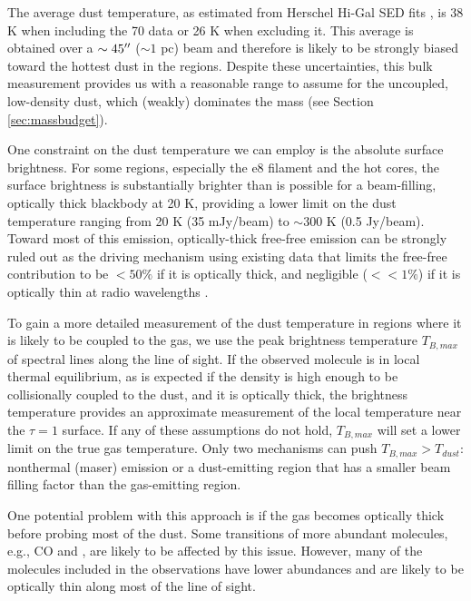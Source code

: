 \documentclass{aa}
\begin{document}
The average dust temperature, as estimated from Herschel Hi-Gal SED fits
\citep{Molinari2016a,Wang2015a}, is 38 K when including the 70 \um data or 26 K
when excluding it.  This average is obtained over a $\sim45\mbox{$^{\prime\prime}$}$ ($\sim 1$
pc) beam and therefore is likely to be strongly biased toward the hottest dust
in the \hii regions.  Despite these
uncertainties, this bulk measurement provides us with a reasonable range to
assume for the uncoupled, low-density dust, which (weakly) dominates the mass
(see Section \ref{sec:massbudget}).

One constraint on the dust temperature we can employ is the absolute surface
brightness.  For some regions, especially the e8 filament and the hot cores,
the surface brightness is substantially
brighter than is possible for a beam-filling, optically thick blackbody at 20
K, providing a lower limit on the dust temperature ranging from 20 K (35
mJy/beam) to $\sim300$ K (0.5 Jy/beam).  Toward most of this emission, optically-thick
free-free emission can be strongly ruled out as the driving mechanism using
existing data that limits the free-free contribution to be $<50\%$ if it is
optically thick, and negligible ($<<1\%$) if it is optically thin at radio wavelengths
\citep{Ginsburg2016b, Goddi2016a}.

To gain a more detailed measurement of the dust temperature in regions where it
is likely to be coupled to the gas, we use the peak brightness temperature
$T_{B,max}$ of spectral lines along the line of sight.  If the observed
molecule is in local thermal equilibrium, as is expected if the density is high
enough to be collisionally coupled to the dust, and it is optically thick, the
brightness temperature provides an approximate measurement of the local
temperature near the $\tau=1$ surface.  If any of these assumptions do not
hold, $T_{B,max}$ will set a lower limit on the true gas temperature.  Only 
two mechanisms can push $T_{B,max} > T_{dust}$: nonthermal (maser) emission or
a dust-emitting region that has a smaller beam filling factor than the
gas-emitting region.

One potential problem with this approach is if the gas becomes optically thick
before probing most of the dust.  Some transitions of more abundant molecules,
e.g., CO and \formaldehyde, are likely to be affected by this issue.  However,
many of the molecules included in the observations have lower abundances and
are likely to be optically thin along most of the line of sight.
\end{document}
